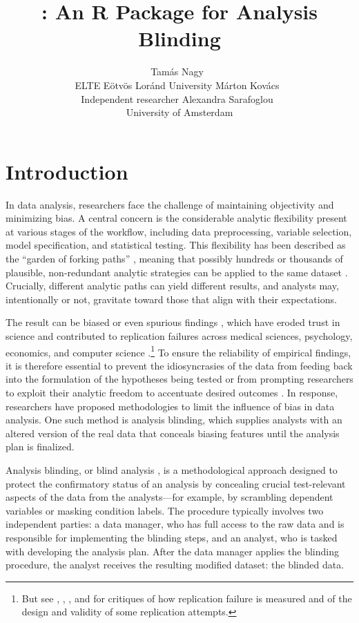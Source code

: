 \documentclass[
]{jss}
\author{
Tamás Nagy~\orcidlink{00000-0001-5244-0356}\\ELTE Eötvös Loránd
University \And Márton
Kovács~\orcidlink{0000-0002-8142-8492}\\Independent
researcher \And Alexandra
Sarafoglou~\orcidlink{0000-0003-0031-685X}\\University of Amsterdam
}
\title{\pkg{vazul}: An R Package for Analysis Blinding}
\begin{document}
\section{Introduction}\label{introduction}

In data analysis, researchers face the challenge of maintaining
objectivity and minimizing bias. A central concern is the considerable
analytic flexibility present at various stages of the workflow,
including data preprocessing, variable selection, model specification,
and statistical testing. This flexibility has been described as the
``garden of forking paths'' \citep{gelman2013garden}, meaning that
possibly hundreds or thousands of plausible, non-redundant analytic
strategies can be applied to the same dataset
\citep{steegen2016increasing, SimonsohnEtAl2020}. Crucially, different
analytic paths can yield different results, and analysts may,
intentionally or not, gravitate toward those that align with their
expectations.

The result can be biased or even spurious findings
\citep{ioannidis2005most, simmons2011false, gelman2016statistical},
which have eroded trust in science and contributed to replication
failures across medical sciences, psychology, economics, and computer
science
\citep{ioannidis2005contradicted, open2015estimating, baker2016scientists, nosek2022replicability, pashler2012editors, camerer2016evaluating, cockburn2020threats}.\footnote{But
  see \citet{gilbert2016}, \citet{muradchanian2021best},
  \citet{savitz2024responding}, and \citet{mcshane2024statistical} for
  critiques of how replication failure is measured and of the design and
  validity of some replication attempts.} To ensure the reliability of
empirical findings, it is therefore essential to prevent the
idiosyncrasies of the data from feeding back into the formulation of the
hypotheses being tested \citep[HARKing,][]{kerr1998harking} or from
prompting researchers to exploit their analytic freedom to accentuate
desired outcomes \citep{simmons2011false}. In response, researchers have
proposed methodologies to limit the influence of bias in data analysis.
One such method is analysis blinding, which supplies analysts with an
altered version of the real data that conceals biasing features until
the analysis plan is finalized.

Analysis blinding, or blind analysis
\citep{maccoun2015hide, maccoun2018psychological}, is a methodological
approach designed to protect the confirmatory status of an analysis by
concealing crucial test-relevant aspects of the data from the
analysts---for example, by scrambling dependent variables or masking
condition labels. The procedure typically involves two independent
parties: a data manager, who has full access to the raw data and is
responsible for implementing the blinding steps, and an analyst, who is
tasked with developing the analysis plan. After the data manager applies
the blinding procedure, the analyst receives the resulting modified
dataset: the blinded data.
\end{document}
